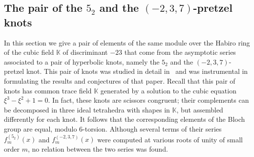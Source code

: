 \documentclass[12pt,reqno]{amsart}
\theoremstyle{definition}
\def\BK{\mathbb K}
\def\Phitof{f}
\begin{document}
\subsection{\texorpdfstring{The pair of the $5_2$ and the
    $(-2,3,7)$-pretzel knots}{The pair of the 5\_2 and the (-2,3,7)-pretzel knots}}
\label{sub.52-237}

In this section we give a pair of elements of the same module over the Habiro
ring of the cubic field $\BK$ of discriminant $-23$ that come from the asymptotic
series associated to a pair of hyperbolic knots, namely the $5_2$ and the
$(-2,3,7)$-pretzel knot. This pair of knots was studied in detail in~\cite{GZ:kashaev}
and was instrumental in formulating the results and conjectures of that paper. Recall
that this pair of knots has common trace field $\BK$ generated by a solution to
the cubic equation $\xi^3-\xi^2+1=0$. In fact, these knots are scissors congruent;
their complements can be decomposed in three ideal tetrahedra with shapes in $\BK$,
but assembled differently for each knot. It follows that the corresponding elements of
the Bloch group are equal, modulo 6-torsion. Although several terms of their series
$\Phitof^{(5_2)}_m(x)$ and $\Phitof^{(-2,3,7)}_m(x)$ were computed at various roots of
unity of small order $m$, no relation between the two series was found.
\end{document}

